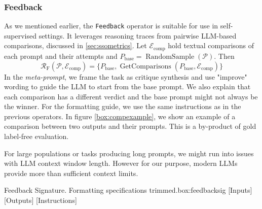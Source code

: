 \subsubsection{Feedback}
As we mentioned earlier, the \texttt{Feedback} operator is suitable for use in self-supervised settings.
It leverages reasoning traces from pairwise LLM-based comparisons, discussed in \ref{sec:ssometrics}. 
Let $\mathcal{E}_{\text{comp}}$ hold textual comparisons of each prompt and their attempts and
$P_{\text{base}} = \operatorname{RandomSample}(\mathscr{P})$. Then
\begin{equation}
    \mathcal{R}_{\text{F}}(\mathscr{P}, \mathcal{E}_{\text{comp}}) = \{P_{\text{base}}, \operatorname{GetComparisons}(P_{\text{base}}, \mathcal{E}_{\text{comp}})\}
\end{equation}
In the \textit{meta-prompt}, we frame the task as critique synthesis and use "improve" wording to guide the LLM to start from the base prompt.
We also explain that each comparison has a different verdict and the base prompt might not always be the winner. For the formatting guide, we use the same instructions
as in the previous operators. In figure \ref{box:compexample}, we show an example of a comparison between two outputs and their prompts. This is a by-product of gold label-free evaluation.

For large populations or tasks producing long prompts, we might run into issues with LLM context window length. 
However for our purpose, modern LLMs provide more than sufficient context limits. 
\begin{figurebox}{Feedback Signature. Formatting specifications trimmed.}{box:feedbacksig}
    [Inputs]
    [Outputs]
    [Instructions]
\end{figurebox}

